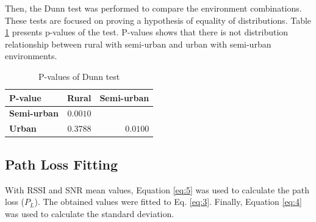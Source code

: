 \begin{itemize}
Then, the Dunn test was performed to compare the environment combinations. These tests are focused on proving a hypothesis of equality of distributions. Table \ref{tab:testresults} presents p-values of the test. P-values shows that there is not distribution relationship between rural with semi-urban and urban with semi-urban environments.

\begin{table}[h!]
\centering
\caption{P-values of Dunn test}
\label{tab:testresults}
\begin{tabular}{@{}lrr@{}}
\toprule
\textbf{P-value}    & \textbf{Rural} & \textbf{Semi-urban}  \\ \midrule
\textbf{Semi-urban} & $0.0010$         & \multicolumn{1}{l}{} \\
\textbf{Urban}     & $0.3788$         & $0.0100$                 \\ \bottomrule
\end{tabular}
\end{table}


\end{itemize}

\subsection{Path Loss Fitting}
\label{sub:fitting}

With RSSI and SNR mean values, Equation \eqref{eq:5} was used to calculate the path loss ($P_L$). The obtained values were fitted to Eq. \eqref{eq:3}. Finally, Equation \eqref{eq:4} was used to calculate the standard deviation.

